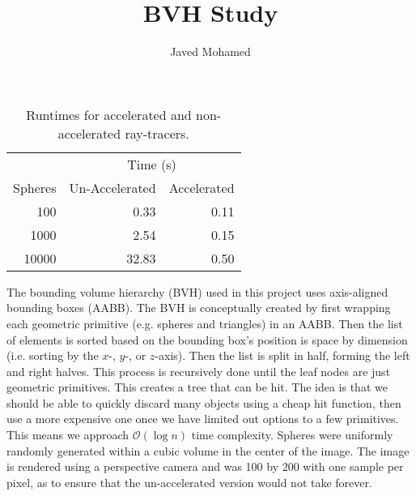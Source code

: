 \documentclass[a4]{article}
\author{Javed Mohamed}
\title{BVH Study}
\begin{document}
\maketitle

\begin{table*}[h]
  \centering
  \begin{tabular}[h]{rrr}
    \toprule
    & \multicolumn{2}{c}{Time (\si{\second})}\\
    \cmidrule(l){2-3}
    Spheres & Un-Accelerated & Accelerated \\
    \midrule
    100 & 0.33 & 0.11 \\
    1000 & 2.54 & 0.15 \\
    10000 & 32.83 & 0.50 \\
    \bottomrule
  \end{tabular}
  \caption[Ray-tracer runtimes]{Runtimes for accelerated and non-accelerated
    ray-tracers.}
  \label{tab:runtimes}
\end{table*}

The bounding volume hierarchy (BVH) used in this project uses axis-aligned
bounding boxes (AABB). The BVH is conceptually created by first wrapping each
geometric primitive (e.g. spheres and triangles) in an AABB. Then the list of
elements is sorted based on the bounding box's position is space by dimension
(i.e. sorting by the $x$-, $y$-, or $z$-axis). Then the list is split in half,
forming the left and right halves. This process is recursively done until the
leaf nodes are just geometric primitives. This creates a tree that can be hit.
The idea is that we should be able to quickly discard many objects using a cheap
hit function, then use a more expensive one once we have limited out options to
a few primitives. This means we approach $\mathcal{O}(\log n)$ time complexity.
Spheres were uniformly randomly generated within a cubic volume in the center of
the image. The image is rendered using a perspective camera and was 100 by 200
with one sample per pixel, as to ensure that the un-accelerated version would
not take forever.
\end{document}
